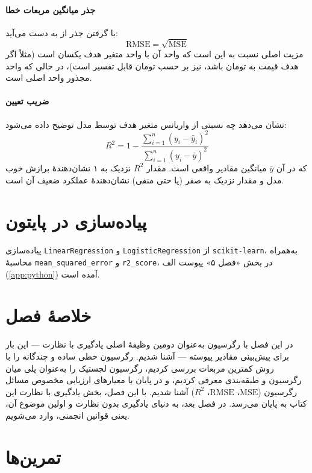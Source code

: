 \paragraph{جذر میانگین مربعات خطا}
با گرفتن جذر از  به دست می‌آید:
\[
\text{RMSE} = \sqrt{\text{MSE}}
\]
مزیت اصلی  نسبت به  این است که واحد آن با واحد متغیر
هدف یکسان است (مثلاً اگر هدف قیمت به تومان باشد،  نیز بر حسب
تومان قابل تفسیر است)، در حالی که واحد  مجذور واحد اصلی است.

\paragraph{ضریب تعیین}
 نشان
می‌دهد چه نسبتی از واریانس متغیر هدف توسط مدل توضیح داده می‌شود:
\[
R^2 = 1 - \frac{\sum_{i=1}^{n} (y_i - \hat{y}_i)^2}{\sum_{i=1}^{n} (y_i - \bar{y})^2}
\]
که در آن $\bar{y}$ میانگین مقادیر واقعی است. مقدار $R^2$ نزدیک به ۱
نشان‌دهندهٔ برازش خوب مدل و مقدار نزدیک به صفر (یا حتی منفی) نشان‌دهندهٔ
عملکرد ضعیف آن است.

\section*{پیاده‌سازی در پایتون}

پیاده‌سازی \texttt{LinearRegression} و \texttt{LogisticRegression} از
\texttt{scikit-learn}، به‌همراه محاسبهٔ \texttt{mean\_squared\_error} و
\texttt{r2\_score}، در بخش «فصل ۵» پیوست الف (\ref{app:python}) آمده
است.

\section*{خلاصهٔ فصل}

در این فصل با رگرسیون به‌عنوان دومین وظیفهٔ اصلی یادگیری با نظارت — این
بار برای پیش‌بینی مقادیر پیوسته — آشنا شدیم. رگرسیون خطی ساده و چندگانه
را با روش کمترین مربعات بررسی کردیم، رگرسیون لجستیک را به‌عنوان پلی
میان رگرسیون و طبقه‌بندی معرفی کردیم، و در پایان با معیارهای ارزیابی
مخصوص مسائل رگرسیون ($\text{MSE}$، $\text{RMSE}$، $R^2$) آشنا شدیم. با
این فصل، بخش یادگیری با نظارت این کتاب به پایان می‌رسد. در فصل بعد، به
دنیای یادگیری بدون نظارت و اولین موضوع آن، یعنی قوانین انجمنی، وارد
می‌شویم.

\section*{تمرین‌ها}

